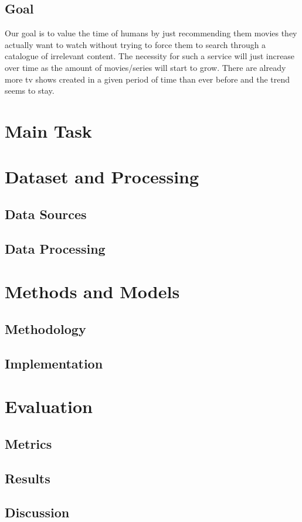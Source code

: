 \documentclass[12pt,a4paper]{article}
\begin{document}
  \subsection{Goal}
  Our goal is to value the time of humans by just recommending them movies they actually want to watch without trying to force them to search through a catalogue of irrelevant content.
  The necessity for such a service will just increase over time as the amount of movies/series will start to grow.
  There are already more tv shows created in a given period of time than ever before and the trend seems to stay.

  \section{Main Task}

  

  \section{Dataset and Processing}
  \subsection{Data Sources}

  \subsection{Data Processing}


  \section{Methods and Models}

  \subsection{Methodology}
  \subsection{Implementation}

  \section{Evaluation}
  \subsection{Metrics}

  \subsection{Results}

  \subsection{Discussion}
\end{document}
